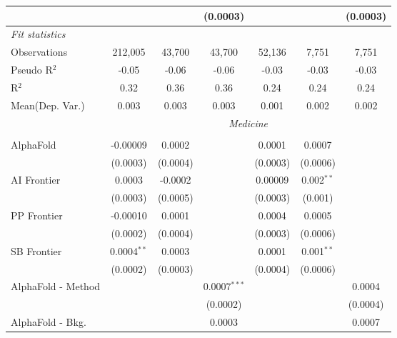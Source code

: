 \begin{tabular}{lcccccc}
                                 &               &               & (0.0003)       &                &                & (0.0003)\\   
   \midrule
   \emph{Fit statistics}\\
   Observations                  & 212,005       & 43,700        & 43,700         & 52,136         & 7,751          & 7,751\\  
   Pseudo R$^2$                  & -0.05         & -0.06         & -0.06          & -0.03          & -0.03          & -0.03\\  
   R$^2$                         & 0.32          & 0.36          & 0.36           & 0.24           & 0.24           & 0.24\\  
   
Mean(Dep. Var.) & 0.003 & 0.003 & 0.003 & 0.001 & 0.002 & 0.002 \\
 & \multicolumn{6}{c}{\textit{Medicine}} \\ \\
   AlphaFold                     & -0.00009      & 0.0002   &                & 0.0001   & 0.0007       &   \\   
                                 & (0.0003)      & (0.0004) &                & (0.0003) & (0.0006)     &   \\   
   AI Frontier                   & 0.0003        & -0.0002  &                & 0.00009  & 0.002$^{**}$ &   \\   
                                 & (0.0003)      & (0.0005) &                & (0.0003) & (0.001)      &   \\   
   PP Frontier                   & -0.00010      & 0.0001   &                & 0.0004   & 0.0005       &   \\   
                                 & (0.0002)      & (0.0004) &                & (0.0003) & (0.0006)     &   \\   
   SB Frontier                   & 0.0004$^{**}$ & 0.0003   &                & 0.0001   & 0.001$^{**}$ &   \\   
                                 & (0.0002)      & (0.0003) &                & (0.0004) & (0.0006)     &   \\   
   AlphaFold - Method            &               &          & 0.0007$^{***}$ &          &              & 0.0004\\   
                                 &               &          & (0.0002)       &          &              & (0.0004)\\   
   AlphaFold - Bkg.              &               &          & 0.0003         &          &              & 0.0007\\   

\end{tabular}
